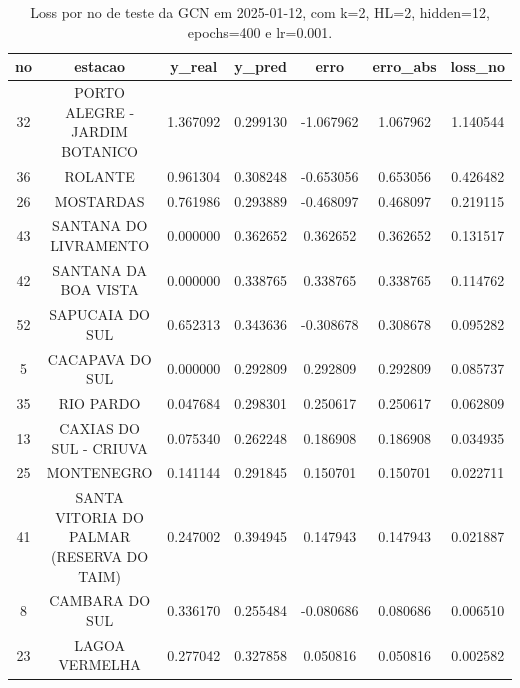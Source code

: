 \begin{table}[h]
\centering
\caption{Loss por no de teste da GCN em 2025-01-12, com k=2, HL=2, hidden=12, epochs=400 e lr=0.001.}
\label{tab:gcn_loss_k2_hl2_h12_e400_d20250112}
\begin{tabular}{ccccccc}
\toprule
no & estacao & y\_real & y\_pred & erro & erro\_abs & loss\_no \\
\midrule
32 & PORTO ALEGRE - JARDIM BOTANICO & 1.367092 & 0.299130 & -1.067962 & 1.067962 & 1.140544 \\
36 & ROLANTE & 0.961304 & 0.308248 & -0.653056 & 0.653056 & 0.426482 \\
26 & MOSTARDAS & 0.761986 & 0.293889 & -0.468097 & 0.468097 & 0.219115 \\
43 & SANTANA DO LIVRAMENTO & 0.000000 & 0.362652 & 0.362652 & 0.362652 & 0.131517 \\
42 & SANTANA DA BOA VISTA & 0.000000 & 0.338765 & 0.338765 & 0.338765 & 0.114762 \\
52 & SAPUCAIA DO SUL & 0.652313 & 0.343636 & -0.308678 & 0.308678 & 0.095282 \\
5 & CACAPAVA DO SUL & 0.000000 & 0.292809 & 0.292809 & 0.292809 & 0.085737 \\
35 & RIO PARDO & 0.047684 & 0.298301 & 0.250617 & 0.250617 & 0.062809 \\
13 & CAXIAS DO SUL - CRIUVA & 0.075340 & 0.262248 & 0.186908 & 0.186908 & 0.034935 \\
25 & MONTENEGRO & 0.141144 & 0.291845 & 0.150701 & 0.150701 & 0.022711 \\
41 & SANTA VITORIA DO PALMAR (RESERVA DO TAIM) & 0.247002 & 0.394945 & 0.147943 & 0.147943 & 0.021887 \\
8 & CAMBARA DO SUL & 0.336170 & 0.255484 & -0.080686 & 0.080686 & 0.006510 \\
23 & LAGOA VERMELHA & 0.277042 & 0.327858 & 0.050816 & 0.050816 & 0.002582 \\
\bottomrule
\end{tabular}
\end{table}
